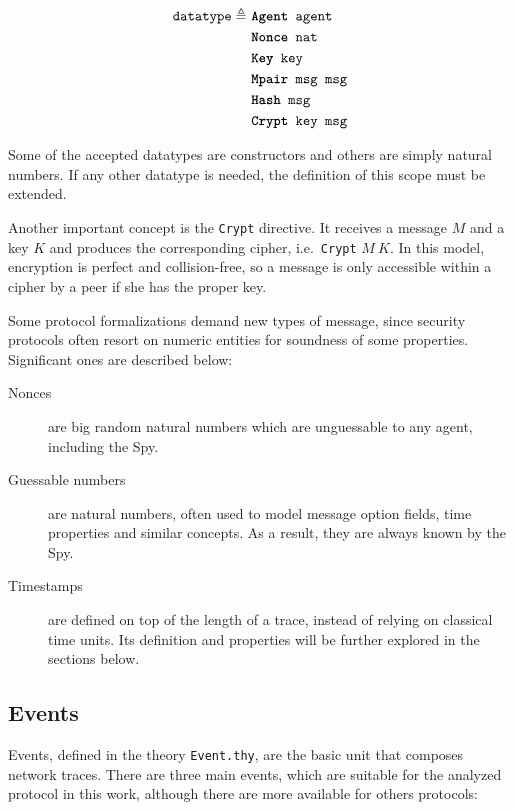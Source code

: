 \begin{equation*}
  \begin{split}
    \texttt{datatype} \triangleq\
    & \texttt{\textbf{Agent} agent} \\
    & \texttt{\textbf{Nonce} nat} \\
    & \texttt{\textbf{Key} key} \\
    & \texttt{\textbf{Mpair} msg msg} \\
    & \texttt{\textbf{Hash} msg} \\
    & \texttt{\textbf{Crypt} key msg}
  \end{split}
\end{equation*}

Some of the accepted datatypes are constructors and others are simply natural numbers. If any other datatype is needed, the definition of this scope must be extended.

Another important concept is the \texttt{Crypt} directive. It receives a message \(M\) and a key \(K\) and produces the corresponding cipher, i.e.\ \texttt{Crypt} \(M\ K\). In this model, encryption is perfect and collision-free, so a message is only accessible within a cipher by a peer if she has the proper key.

Some protocol formalizations demand new types of message, since security protocols often resort on numeric entities for soundness of some properties. Significant ones are described below:

\begin{description}
  \item[Nonces] are big random natural numbers which are unguessable to any agent, including the Spy.

  \item[Guessable numbers] are natural numbers, often used to model message option fields, time properties and similar concepts. As a result, they are always known by the Spy.

  \item[Timestamps] are defined on top of the length of a trace, instead of relying on classical time units. Its definition and properties will be further explored in the sections below.
\end{description}



\subsection{Events}
Events, defined in the theory \texttt{Event.thy}, are the basic unit that composes network traces. There are three main events, which are suitable for the analyzed protocol in this work, although there are more available for others protocols:

